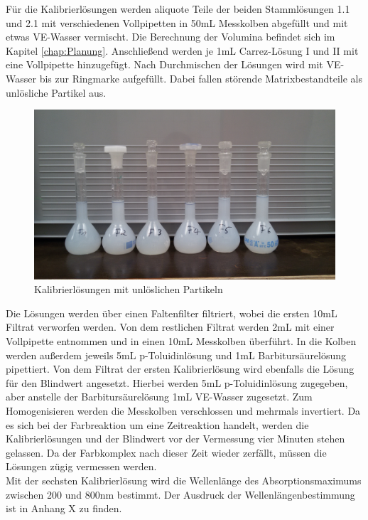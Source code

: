 Für die Kalibrierlösungen werden aliquote Teile der beiden Stammlösungen 1.1 und 2.1 mit verschiedenen Vollpipetten in 50mL Messkolben abgefüllt und mit etwas VE-Wasser vermischt. Die Berechnung der Volumina befindet sich im Kapitel \ref{chap:Planung}. Anschließend werden je 1mL Carrez-Lösung I und II mit eine Vollpipette hinzugefügt. Nach Durchmischen der Lösungen wird mit VE-Wasser bis zur Ringmarke aufgefüllt. Dabei fallen störende Matrixbestandteile als unlösliche Partikel aus.\\
\begin{figure}[htbp]
	\centering
		\includegraphics[width=1.00\textwidth]{../Bilder/20150424_155955.jpg}
	\caption{Kalibrierlösungen mit unlöslichen Partikeln}
	\label{fig:Partikel}
\end{figure}
Die Lösungen werden über einen Faltenfilter filtriert, wobei die ersten 10mL Filtrat verworfen werden. Von dem restlichen Filtrat werden 2mL mit einer Vollpipette entnommen und in einen 10mL Messkolben überführt. In die Kolben werden außerdem jeweils 5mL p-Toluidinlösung und 1mL Barbitursäurelösung pipettiert. Von dem Filtrat der ersten Kalibrierlösung wird ebenfalls die Lösung für den Blindwert angesetzt. Hierbei werden 5mL p-Toluidinlösung zugegeben, aber anstelle der Barbitursäurelösung 1mL VE-Wasser zugesetzt. Zum Homogenisieren werden die Messkolben verschlossen und mehrmals invertiert. Da es sich bei der Farbreaktion um eine Zeitreaktion handelt, werden die Kalibrierlösungen und der Blindwert vor der Vermessung vier Minuten stehen gelassen. Da der Farbkomplex nach dieser Zeit wieder zerfällt, müssen die Lösungen zügig vermessen werden.\\
Mit der sechsten Kalibrierlösung wird die Wellenlänge des Absorptionsmaximums zwischen 200 und 800nm bestimmt. Der Ausdruck der Wellenlängenbestimmung ist in Anhang X zu finden.\\

